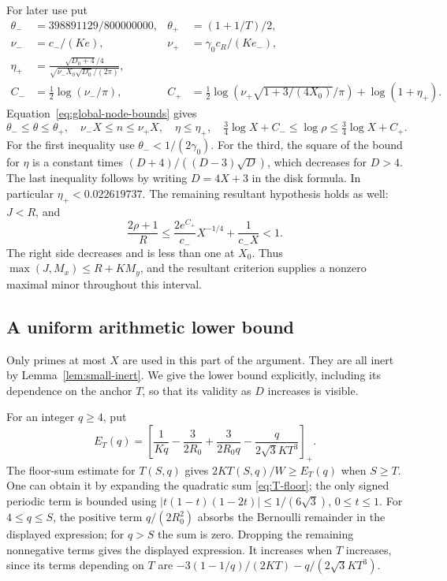 For later use put
\begin{align*}
 \theta_-&=398891129/800000000,&\theta_+&=(1+1/T)/2,\\
 \nu_-&=c_-/(Ke),&\nu_+&=\gamma_0c_R/(Ke_-),\\
 \eta_+&=\frac{\sqrt{D_0+4}/4}
                  {\sqrt{\nu_-X_0\sqrt{D_0}/(2\pi)}},\\
 C_-&=\tfrac12\log(\nu_-/\pi),&
 C_+&=\tfrac12\log\left(\nu_+\sqrt{1+3/(4X_0)}/\pi\right)
                                      +\log(1+\eta_+).
\end{align*}
Equation~\eqref{eq:global-node-bounds} gives
\begin{equation}\label{eq:global-geometry}
 \theta_-\leq\theta\leq\theta_+,\quad
 \nu_-X\leq n\leq\nu_+X,\quad \eta\leq\eta_+,
 \quad \tfrac34\log X+C_-\leq\log\rho\leq\tfrac34\log X+C_+.
\end{equation}
For the first inequality use $\theta_-<1/(2\gamma_0)$.
For the third, the square of the bound for $\eta$ is a constant times
$(D+4)/((D-3)\sqrt D)$, which decreases for $D>4$.
The last inequality follows by writing $D=4X+3$ in the disk formula.
In particular $\eta_+<0.022619737$.
The remaining resultant hypothesis holds as well: $J<R$, and
\[
 \frac{2\rho+1}{R}
 \leq\frac{2e^{C_+}}{c_-}X^{-1/4}+\frac1{c_-X}<1.
\]
The right side decreases and is less than one at $X_0$.
Thus $\max(J,M_x)\leq R+KM_y$, and the resultant criterion supplies
a nonzero maximal minor throughout this interval.

\subsection{A uniform arithmetic lower bound}
Only primes at most $X$ are used in this part of the argument. They are
all inert by Lemma~\ref{lem:small-inert}. We give the lower bound
explicitly, including its dependence on the anchor $T$, so that its
validity as $D$ increases is visible.

For an integer $q\geq4$, put
\[
 E_T(q)=\left[\frac1{Kq}-\frac3{2R_0}+
             \frac3{2R_0q}-\frac{q}{2\sqrt3KT^3}\right]_+.
\]
The floor-sum estimate for $T(S,q)$ gives
$2KT(S,q)/W\geq E_T(q)$ when $S\geq T$.
One can obtain it by expanding the quadratic sum
\eqref{eq:T-floor}; the only signed periodic term is bounded using
$|t(1-t)(1-2t)|\leq1/(6\sqrt3)$, $0\leq t\leq1$.
For $4\leq q\leq S$, the positive term $q/(2R_0^2)$ absorbs the
Bernoulli remainder in the displayed expression; for $q>S$ the sum is zero.
Dropping the remaining nonnegative terms gives the displayed expression.
It increases when $T$ increases, since its terms depending on $T$ are
$-3(1-1/q)/(2KT)-q/(2\sqrt3KT^3)$.

